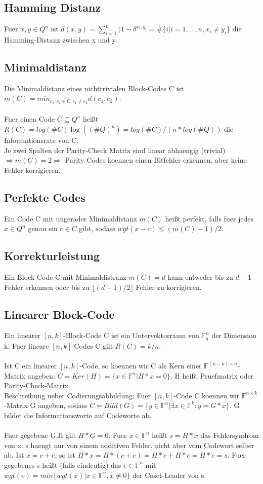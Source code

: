 \documentclass[a4paper]{scrreprt}
\begin{document}
\subsection{Hamming Distanz}
Fuer $x,y \in Q^n$ ist $d(x,y) = \sum_{i=1}^n(1-\delta^{x_i, y_i} = \#\{i|i = 1,...,n,x_i \neq y_i\}$ die Hamming-Distanz zwischen x und y.

\subsection{Minimaldistanz}
Die Minimaldistanz eines nichttrivialen Block-Codes C ist $m(C) = min_{c_1,c_2 \in C, c_1 \neq c_2}d(c_1, c_2)$.\\\\
Fuer einen Code $C \subseteq Q^n$ heißt $R(C) = log(\#C)\log((\#Q)^n) = log(\#C)/(n*log(\#Q))$ die Informationsrate von C.\\
Je zwei Spalten der Parity-Check Matrix sind linear abhaengig (trivial) $\Rightarrow m(C) = 2 \Rightarrow$ Parity Codes koennen einen Bitfehler erkennen, aber keine Fehler korrigieren.

\subsection{Perfekte Codes}
Ein Code C mit ungerader Minimaldistanz $m(C)$ heißt perfekt, falls fuer jedes $x \in Q^n$ genau ein $c \in C$ gibt, sodass $wgt(x-c) \le (m(C)-1)/2$.

\subsection{Korrekturleistung}
Ein Block-Code C mit Minimaldistranz $m(C) = d$ kann entweder bis zu $d-1$ Fehler erkennen oder bis zu $\lfloor (d-1)/2 \rfloor$ Fehler zu korrigieren.

\subsection{Linearer Block-Code}
Ein linearer $[n,k]$-Block-Code C ist ein Untervektorraum von $\mathbb{F}_q^n$ der Dimension k.
Fuer lineare $[n,k]$-Codes C gilt $R(C) = k/n$.\\\\
Ist C ein linearer $[n,k]$-Code, so koennen wir C als Kern einer $\mathbb{F}^{(n-k)\times n}$-Matrix angeben: $C = Ker(H) = \{x \in \mathbb{F}^n|H*x = 0\}$.
H heißt Pruefmatrix oder Parity-Check-Matrix.\\
Beschreibung ueber Codierungsabbildung: Fuer $[n,k]$-Code C koennen wir $\mathbb{F}^{n \times k}$-Matrix G angeben, sodass $C = Bild(G) = \{y \in \mathbb{F}^n|\exists x \in \mathbb{F}^k:y = G*x\}$.
G bildet die Informationsworte auf Codeworte ab.\\\\
Fuer gegebene G,H gilt $H*G = 0$.
Fuer $x \in \mathbb{F}^n$ heißt $s = H*x$ das Fehlersyndrom von x.
s haengt nur von einem additiven Fehler, nicht aber vom Codewort selber ab. Ist $x = c+e$, so ist $H * x = H*(c+e) = H*c + H*e = H*e = s$.
Fuer gegebenes s heißt (falls eindeutig) das $e \in \mathbb{F}^n$ mit $wgt(e) = min\{wgt(x)|x \in \mathbb{F}^n, x \neq 0\}$ der Coset-Leader von s.
\end{document}
